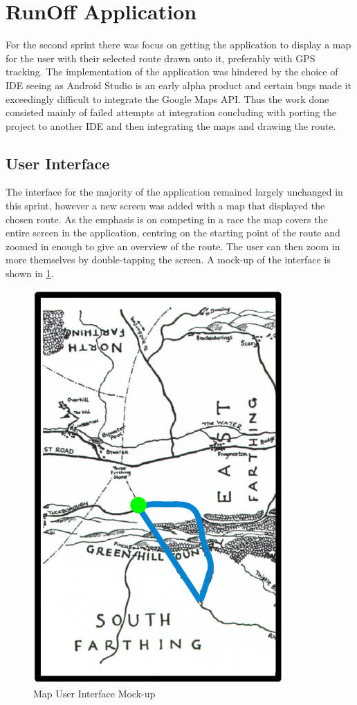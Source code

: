 \section{RunOff Application}
\label{sec:sprint2-app}
For the second sprint there was focus on getting the application to display a map for the user with their selected route drawn onto it, preferably with \ac{GPS} tracking. The implementation of the application was hindered by the choice of \ac{IDE} seeing as Android Studio is an early alpha product and certain bugs made it exceedingly difficult to integrate the Google Maps \ac{API}. Thus the work done consisted mainly of failed attempts at integration concluding with porting the project to another \ac{IDE} and then integrating the maps and drawing the route.

\subsection{User Interface}
The interface for the majority of the application remained largely unchanged in this sprint, however a new screen was added with a map that displayed the chosen route. As the emphasis is on competing in a race the map covers the entire screen in the application, centring on the starting point of the route and zoomed in enough to give an overview of the route. The user can then zoom in more themselves by double-tapping the screen. A mock-up of the interface is shown in \ref{fig:mapMock}.

\begin{figure}[ht]
\begin{center}
 \caption{Map User Interface Mock-up}
 \label{fig:mapMock}
 \includegraphics[scale=0.4]{img/mapMock.png}
\end{center}
\end{figure}

